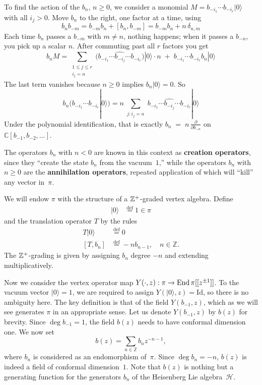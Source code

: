 \documentclass[12pt]{article}
\begin{document}
To find the action of the $b_n$, $n\ge 0$, we consider a monomial $M=b_{-i_1}\cdots b_{-i_r}|0\rangle$ with all $i_j>0$. Move $b_n$ to the right, one factor at a time, using
\[b_n b_{-m}=b_{-m} b_n + [b_n,b_{-m}]
    = b_{-m} b_n + n\,\delta_{n,m}\]
Each time $b_n$ passes a $b_{-m}$ with $m\neq n$, nothing happens; when it passes a $b_{-n}$, you pick up a scalar $n$. After commuting past all $r$ factors you get
\[b_n M
    = \sum_{\substack{1\le j\le r\\ i_j=n}}
    \big(b_{-i_1}\cdots \widehat{b_{-i_j}}\cdots b_{-i_r}\big)|0\rangle
    \cdot n \;+\; b_{-i_1}\cdots b_{-i_r} b_n|0\rangle\]
The last term vanishes because $n\ge0$ implies $b_n|0\rangle=0$. So
\[b_n\big(b_{-i_1}\cdots b_{-i_r}|0\rangle\big)
    = n\sum_{\substack{j: i_j=n}}
    b_{-i_1}\cdots \widehat{b_{-i_j}}\cdots b_{-i_r}|0\rangle\]
Under the polynomial identification, that is exactly
$b_n \;=\; n\,\frac{\partial}{\partial b_{-n}}$
on $\mathbb{C}[b_{-1},b_{-2},\dots]$.


The operators $b_n$ with $n<0$ are known in this context as \textbf{creation operators}, since they ``create the state $b_n$ from the vacuum~$1$,''
while the operators $b_n$ with $n\ge 0$ are the \textbf{annihilation operators}, repeated application of which will ``kill'' any vector in~$\pi$.

We will endow $\pi$ with the structure of a $\mathbb{Z}^+$-graded vertex algebra. Define \begin{align*}
    |0\rangle & \stackrel{\mathrm{def}}{=} 1 \in \pi
\end{align*} and the translation operator $T$ by the rules \begin{align*}
    T|0\rangle & \stackrel{\mathrm{def}}{=} 0                                 \\
    [T,b_n]    & \stackrel{\mathrm{def}}{=} -n b_{n-1}, \quad n\in\mathbb{Z}.
\end{align*} The $\mathbb{Z}^+$-grading is given by assigning $b_n$ degree $-n$ and extending multiplicatively.

Now we consider the vertex operator map $Y(\cdot,z): \pi \to \operatorname{End} \pi[[z^{\pm1}]]$. To the vacuum vector $\lvert 0 \rangle = 1$, we are required to assign $Y(\lvert 0 \rangle, z) = \mathrm{Id}$, so there is no ambiguity here. The key definition is that of the field $Y(b_{-1}, z)$, which as we will see generates $\pi$ in an appropriate sense.
Let us denote $Y(b_{-1}, z)$ by $b(z)$ for brevity.
Since $\deg b_{-1} = 1$, the field $b(z)$ needs to have conformal dimension one.
We now set
\[
    b(z) = \sum_{n\in\mathbb{Z}} b_n z^{-n-1},
\]
where $b_n$ is considered as an endomorphism of~$\pi$.
Since $\deg b_n = -n$, $b(z)$ is indeed a field of conformal dimension~$1$.
Note that $b(z)$ is nothing but a generating function for the generators $b_n$ of the Heisenberg Lie algebra~$\mathcal{H}$.
\end{document}
